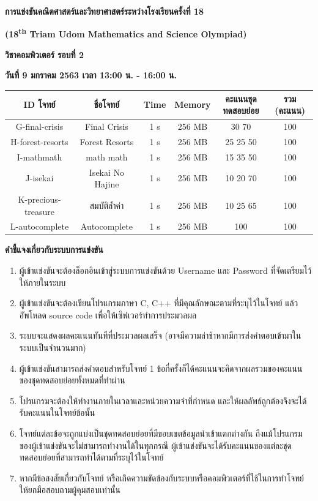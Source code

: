 \documentclass[11pt,a4paper]{article}
\begin{document}
\vspace*{\fill}%
\noindent
\begin{center}
{\Large \textbf{การแข่งขันคณิตศาสตร์และวิทยาศาสตร์ระหว่างโรงเรียนครั้งที่ 18}}

{\Large \textbf{(18\textsuperscript{th} Triam Udom Mathematics and Science Olympiad)}} 

{\Large\textbf{วิชาคอมพิวเตอร์ รอบที่ 2}}

{\Large\textbf{วันที่ 9 มกราคม 2563 เวลา 13:00 น. - 16:00 น.}}

\begin{tabular}{ |c|c|c|c|c|c|  }
  \hline
  \textbf{ID โจทย์} & ชื่อโจทย์ & Time & Memory & คะแนนชุดทดสอบย่อย & รวม (คะแนน)\\
  \hline
  G-final-crisis & Final Crisis & 1 s & 256 MB & 30 70 & 100\\
  H-forest-resorts & Forest Resorts & 1 s & 256 MB & 25 25 50 & 100\\
  I-mathmath & math math & 1 s & 256 MB & 15 35 50 & 100\\
  J-isekai & Isekai No Hajine & 1 s & 256 MB & 10 20 70 & 100\\
  K-precious-treasure & สมบัติล้ำค่า & 1 s & 256 MB & 10 25 65 & 100\\
  L-autocomplete & Autocomplete & 1 s & 256 MB & 100 & 100\\
  \hline
\end{tabular}

\end{center}
\vfill
\pagebreak

{\Large \textbf{คำชี้แจงเกี่ยวกับระบบการแข่งขัน}}

\begin{enumerate}
  \item ผู้เข้าแข่งขันจะต้องล็อกอินเข้าสู่ระบบการแข่งขันด้วย Username และ Password ที่จัดเตรียมไว้ให้ภายในระบบ
  \item ผู้เข้าแข่งขันจะต้องเขียนโปรแกรมภาษา C, C++ ที่มีคุณลักษณะตามที่ระบุไว้ในโจทย์ แล้วอัพโหลด source code เพื่อให้เซิฟเวอร์ทำการประมวลผล
  \item ระบบจะแสดงผลคะแนนทันทีที่ประมวลผลเสร็จ (อาจมีความล่าช้าหากมีการส่งคำตอบเข้ามาในระบบเป็นจำนวนมาก)
  \item ผู้เข้าแข่งขันสามารถส่งคำตอบสำหรับโจทย์ 1 ข้อกี่ครั้งก็ได้คะแนนจะคิดจากผลรวมของคะแนนของชุดทดสอบย่อยทั้งหมดที่ทำผ่าน
  \item โปรแกรมจะต้องให้ทำงานภายในเวลาและหน่วยความจำที่กำหนด และให้ผลลัพธ์ถูกต้องจึงจะได้รับคะแนนในโจทย์ข้อนั้น 
  \item โจทย์แต่ละข้อจะถูกแบ่งเป็นชุดทดสอบย่อยที่มีขอบเขตข้อมูลนำเข้าแตกต่างกัน ถึงแม้โปรแกรมของผู้เข้าแข่งขันจะไม่สามารถทำงานได้ในทุกกรณี ผู้เข้าแข่งขันจะได้รับคะแนนของแต่ละชุดทดสอบย่อยที่สามารถทำได้ตามที่ระบุไว้ในโจทย์
  \item หากมีข้อสงสัยเกี่ยวกับโจทย์ หรือเกิดความขัดข้องกับระบบหรือคอมพิวเตอร์ที่ใช้ในการทำโจทย์ ให้ยกมือสอบถามผู้คุมสอบเท่านั้น
\end{enumerate}
\end{document}
